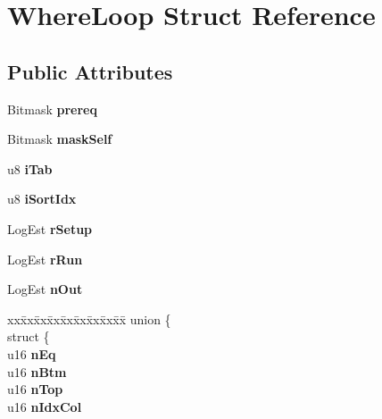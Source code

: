 \hypertarget{struct_where_loop}{}\section{Where\+Loop Struct Reference}
\label{struct_where_loop}
\subsection*{Public Attributes}
\begin{DoxyCompactItemize}
\item 
\mbox{\label{struct_where_loop_aa654af6ecff71bd43c4b0cd6046ccf4d}} 
Bitmask {\bfseries prereq}
\item 
\mbox{\label{struct_where_loop_a0118b20be771241ee29de452ffead61e}} 
Bitmask {\bfseries mask\+Self}
\item 
\mbox{\label{struct_where_loop_a469ad31ae7f3b025667813e2d0aa9d01}} 
u8 {\bfseries i\+Tab}
\item 
\mbox{\label{struct_where_loop_a35e725c988b2bcfb9633a259cd6eba58}} 
u8 {\bfseries i\+Sort\+Idx}
\item 
\mbox{\label{struct_where_loop_a5e28f2d1299993056255158d33baea33}} 
Log\+Est {\bfseries r\+Setup}
\item 
\mbox{\label{struct_where_loop_a1a67183b699c90c23940f540486b07d6}} 
Log\+Est {\bfseries r\+Run}
\item 
\mbox{\label{struct_where_loop_aaef49d7d8188f3dd94d0c9fd0e727448}} 
Log\+Est {\bfseries n\+Out}
\item 
\mbox{\label{struct_where_loop_a8e13962aba0ac6cefb7e428c17f17f4f}} 
\begin{tabbing}
xx\=xx\=xx\=xx\=xx\=xx\=xx\=xx\=xx\=\kill
union \{\\
\>struct \{\\
\>\>u16 {\bfseries nEq}\\
\>\>u16 {\bfseries nBtm}\\
\>\>u16 {\bfseries nTop}\\
\>\>u16 {\bfseries nIdxCol}\\

\end{tabbing}
\end{DoxyCompactItemize}
